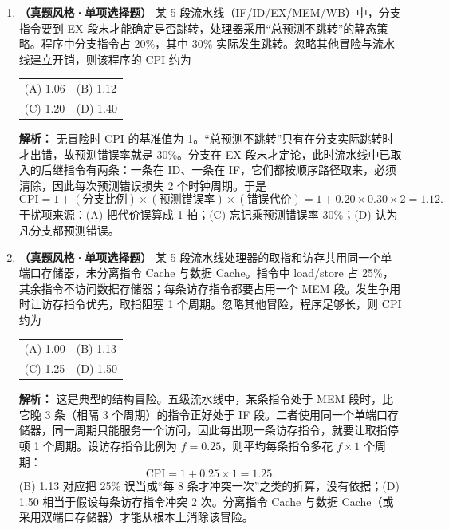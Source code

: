 \begin{enumerate}[resume]

\item \textbf{（真题风格·单项选择题）} 某 5 段流水线（IF/ID/EX/MEM/WB）中，分支指令要到 EX 段末才能确定是否跳转，处理器采用“总预测不跳转”的静态策略。程序中分支指令占 20\%，其中 30\% 实际发生跳转。忽略其他冒险与流水线建立开销，则该程序的 CPI 约为
\begin{center}
\begin{tabular}{ll}
(A) 1.06 & (B) 1.12 \\[6pt]
(C) 1.20 & (D) 1.40
\end{tabular}
\end{center}

\ifshowsolutions\par\noindent\textbf{解析：} 无冒险时 CPI 的基准值为 1。“总预测不跳转”只有在分支实际跳转时才出错，故预测错误率就是 30\%。分支在 EX 段末才定论，此时流水线中已取入的后继指令有两条：一条在 ID、一条在 IF，它们都按顺序路径取来，必须清除，因此每次预测错误损失 2 个时钟周期。于是
\[
\text{CPI}=1+(\text{分支比例})\times(\text{预测错误率})\times(\text{错误代价})
=1+0.20\times0.30\times2=1.12 .
\]
干扰项来源：(A) 把代价误算成 1 拍；(C) 忘记乘预测错误率 30\%；(D) 认为凡分支都预测错误。\else \answerarea \fi

\item \textbf{（真题风格·单项选择题）} 某 5 段流水线处理器的取指和访存共用同一个单端口存储器，未分离指令 Cache 与数据 Cache。指令中 load/store 占 25\%，其余指令不访问数据存储器；每条访存指令都要占用一个 MEM 段。发生争用时让访存指令优先，取指阻塞 1 个周期。忽略其他冒险，程序足够长，则 CPI 约为
\begin{center}
\begin{tabular}{ll}
(A) 1.00 & (B) 1.13 \\[6pt]
(C) 1.25 & (D) 1.50
\end{tabular}
\end{center}

\ifshowsolutions\par\noindent\textbf{解析：} 这是典型的结构冒险。五级流水线中，某条指令处于 MEM 段时，比它晚 3 条（相隔 3 个周期）的指令正好处于 IF 段。二者使用同一个单端口存储器，同一周期只能服务一个访问，因此每出现一条访存指令，就要让取指停顿 1 个周期。设访存指令比例为 $f=0.25$，则平均每条指令多花 $f\times1$ 个周期：
\[
\text{CPI}=1+0.25\times1=1.25 .
\]
(B) 1.13 对应把 25\% 误当成“每 8 条才冲突一次”之类的折算，没有依据；(D) 1.50 相当于假设每条访存指令冲突 2 次。分离指令 Cache 与数据 Cache（或采用双端口存储器）才能从根本上消除该冒险。\else \answerarea \fi


\end{enumerate}
